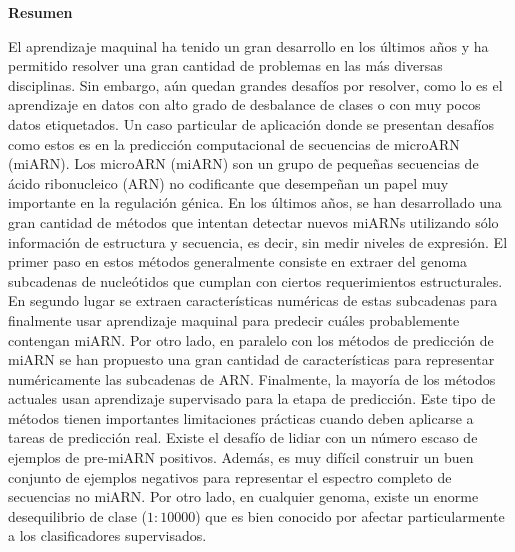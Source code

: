 \newpage
\thispagestyle{fancy}
\vspace{3cm}
\begin{center}
{\huge \textbf{Resumen}}
\end{center}
\vspace{1cm}

El aprendizaje maquinal ha tenido un gran desarrollo en los últimos años y ha permitido resolver una gran cantidad de problemas en las más diversas disciplinas.
Sin embargo, aún quedan grandes desafíos por resolver, como lo es el aprendizaje en datos con alto grado de desbalance de clases o con muy pocos datos
etiquetados. Un caso particular de aplicación donde se presentan desafíos como estos es en la predicción computacional de secuencias de microARN (miARN).  Los
microARN (miARN) son un grupo de pequeñas secuencias de ácido ribonucleico (ARN) no codificante que desempeñan un papel muy importante en la regulación génica.
En los últimos años, se han desarrollado una gran cantidad de métodos que intentan detectar nuevos miARNs utilizando sólo información de estructura y secuencia,
es decir, sin medir niveles de expresión. El primer paso en estos métodos generalmente consiste en extraer del genoma subcadenas de nucleótidos que cumplan con
ciertos requerimientos estructurales. En segundo lugar se extraen características numéricas de estas subcadenas para finalmente usar aprendizaje maquinal para
predecir cuáles probablemente contengan miARN. Por otro lado, en paralelo con los métodos de predicción de miARN se han propuesto una gran cantidad de
características para representar numéricamente las subcadenas de ARN. Finalmente, la mayoría de los métodos actuales usan aprendizaje supervisado para la etapa
de predicción. Este tipo de métodos tienen importantes limitaciones prácticas cuando deben aplicarse a tareas de predicción real.  Existe el desafío de lidiar
con un número escaso de ejemplos de pre-miARN positivos. Además, es muy difícil construir un buen conjunto de ejemplos negativos para representar el espectro
completo de secuencias no miARN. Por otro lado, en cualquier genoma, existe un enorme desequilibrio de clase ($1:10000$) que es bien conocido por afectar
particularmente a los clasificadores supervisados.

